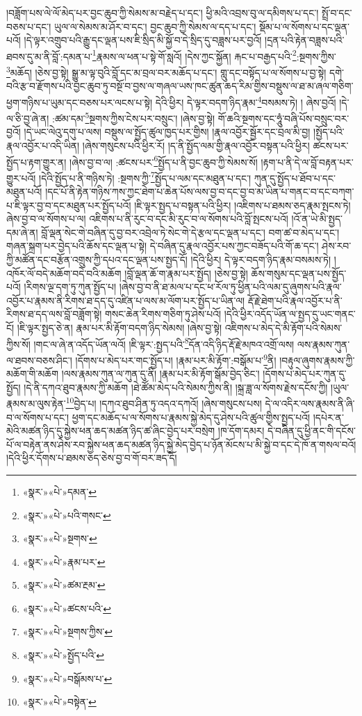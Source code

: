 །བཟློག་པས་ལེ་ལོ་མེད་པར་བྱང་ཆུབ་ཀྱི་སེམས་མ་བརྗེད་པ་དང་། ཕྱི་མའི་འབྲས་བུ་ལ་དམིགས་པ་དང་། སྤྲོ་བ་དང་བཅས་པ་དང་། ཡུལ་ལ་སེམས་མ་ཤོར་བ་དང་། བྱང་ཆུབ་ཀྱི་སེམས་ལ་དད་པ་དང་། སྡོམ་པ་ལ་སོགས་པ་དང་ལྡན་པའོ། །དེ་ལྟར་འགྲུབ་པའི་རྒྱུ་དང་ལྡན་པས་ཇི་སྲིད་མི་སྐྱོ་བ་དེ་སྲིད་དུ་བཟླས་པར་བྱའོ། །དྲན་པའི་རྟེན་བཟླས་པའི་ཐབས་དུ་མ་ནི་བློ་:དམན་པ་\footnote{«སྣར་»«པེ་»དམན་}རྣམས་ལ་ཕན་པ་སྟེ་གོ་སླའོ། །དེས་ཀྱང་སྐྱོན། རྐང་པ་བརྒྱད་པའི་\footnote{«སྣར་»«པེ་»པའི་གསང་}:སྔགས་ཀྱིས་\footnote{«སྣར་»«པེ་»སྔགས་}མཆོད། །ཅེས་བྱ་སྟེ། སྒྱུ་མ་ལྟ་བུའི་བློ་དང་མ་བྲལ་བར་མཆོད་པ་དང་། གླུ་དང་བསྟོད་པ་ལ་སོགས་པ་བྱ་སྟེ། དགེ་བའི་རྩ་བ་རྫོགས་པའི་བྱང་ཆུབ་ཏུ་བསྔོ་བ་བྱས་ལ་གཞལ་ཡས་ཁང་ཚུན་ཆད་རིམ་གྱིས་བསྡུས་ལ་ཐ་མ་ཞལ་གཅིག་ཕྱག་གཉིས་པ་ཡུམ་དང་བཅས་པར་ལངས་པ་སྟེ། དེའི་ཕྱིར། དེ་ལྟར་བདག་ཉིད་རྣམ་\footnote{«སྣར་»«པེ་»རྣམ་པར་}བསམས་ཏེ། །
ཞེས་བྱའོ། །དེ་ལ་ཅི་བྱ་ཞེ་ན། :ཚམ་དམ་\footnote{«སྣར་»«པེ་»ཚམ་རྔམ་}སྔགས་ཀྱིས་ངེས་པར་བསྲུང་། །ཞེས་བྱ་སྟེ། གོ་ཆའི་སྔགས་དང་ཧཱུཾ་བཞི་པོས་བསྲུང་བར་བྱའོ། །དེ་ཡང་ལེའུ་དགུ་པ་ལས། བསྡུས་ལ་སྤྱོད་ཚུལ་ཁྱད་པར་གྱིས། །རྣལ་འབྱོར་སྦྱོར་དང་བྲལ་མི་བྱ། །སྤྱོད་པའི་རྣལ་འབྱོར་པ་འདི་ཡིན། །ཞེས་གསུངས་པའི་ཕྱིར་རོ། །ད་ནི་སྤྱོད་ལམ་གྱི་རྣལ་འབྱོར་བསྟན་པའི་ཕྱིར། ཚངས་པར་སྤྱོད་པ་རྟག་གྱུར་ན། །ཞེས་བྱ་བ་ལ། :ཚངས་པར་\footnote{«སྣར་»«པེ་»ཚངས་པའི་}སྤྱོད་པ་ནི་བྱང་ཆུབ་ཀྱི་སེམས་སོ། །རྟག་པ་ནི་དེ་ལ་བློ་བརྟན་པར་གྱུར་པའོ། །དེའི་སྤྱོད་པ་ནི་གཉིས་ཏེ། :སྔགས་ཀྱི་\footnote{«སྣར་»«པེ་»སྔགས་ཀྱིས་}སྤྱོད་པ་ལམ་དང་མཐུན་པ་དང་། ཀུན་དུ་སྤྱོད་པ་ཐོབ་པ་དང་མཐུན་པའོ། །དང་པོ་ནི་རྟེན་གཉིས་ཀས་ཀྱང་ཐེག་པ་ཆེན་པོས་ལས་བྱ་བ་དང་བྱ་བ་མ་ཡིན་པ་གནང་བ་དང་བཀག་པ་ཇི་ལྟར་བྱ་བ་དང་མཐུན་པར་སྤྱོད་པའོ། །ཇི་ལྟར་སྤྱད་པ་བསྟན་པའི་ཕྱིར། །འཇིགས་པ་ཐམས་ཅད་རྣམ་སྤངས་ཏེ། ཞེས་བྱ་བ་ལ་སོགས་པ་ལ། འཇིགས་པ་ནི་རུང་བ་དང་མི་རུང་བ་ལ་སོགས་པའི་བློ་སྤངས་པའོ། །འོ་ན་ཡེ་མི་སྤྱད་དམ་ཞེ་ན། བློ་ལྡན་སེང་གེ་བཞིན་དུ་བྱ་བར་འབྲེལ་ཏེ་སེང་གེ་དེ་རྩལ་དང་ལྡན་པ་དང་། བག་ཚ་བ་མེད་པ་དང་། གཞན་སྐྲག་པར་བྱེད་པའི་ཆོས་དང་ལྡན་པ་སྟེ། དེ་བཞིན་དུ་རྣལ་འབྱོར་པས་ཀྱང་བཟོད་པའི་གོ་ཆ་དང་། ཤེས་རབ་ཀྱི་མཚོན་དང་བརྩོན་འགྲུས་ཀྱི་དཔའ་དང་ལྡན་པས་སྤྱད་དོ། །དེའི་ཕྱིར། དེ་ལྟར་བདག་ཉིད་རྣམ་བསམས་ཏེ། །འཁོར་ལོ་བདེ་མཆོག་བདེ་བའི་མཆོག །བློ་ལྡན་ཆོ་ག་རྣམ་པར་སྤྱོད། །ཅེས་བྱ་སྟེ། ཆོས་གསུམ་དང་ལྡན་པས་སྤྱོད་པའོ། །རིགས་ལྔ་དག་ཏུ་ཀུན་སྤྱོད་པ། །ཞེས་བྱ་བ་ནི་ཐ་མལ་པ་དང་ཕ་རོལ་ཏུ་ཕྱིན་པའི་ལམ་དུ་ཞུགས་པའི་རྣལ་འབྱོར་པ་རྣམས་ནི་རིགས་ཐ་དད་དུ་འཛིན་པ་ལས་མ་ལོག་པར་སྤྱོད་པ་ཡིན་ལ། རྡོ་རྗེ་ཐེག་པའི་རྣལ་འབྱོར་པ་ནི་རིགས་ཐ་དད་ལས་བློ་བཟློག་སྟེ། གསང་ཆེན་རིགས་གཅིག་ཏུ་ཤེས་པའོ། །དེའི་ཕྱིར་འདོད་ཡོན་ལ་སྤྱད་དུ་ཡང་གནང་ངོ། །ཇི་ལྟར་སྤྱད་ཅེ་ན། རྣམ་པར་མི་རྟོག་བདག་ཉིད་སེམས། །ཞེས་བྱ་སྟེ། འཇིགས་པ་མེད་དེ་མི་རྟོག་པའི་སེམས་ཀྱིས་སོ། །གང་ལ་ཞེ་ན་འདོད་ཡོན་ལའོ། །ཇི་ལྟར་:སྤྱད་པའི་\footnote{«སྣར་»«པེ་»སྤྱོད་པའི་}དོན་འདི་ཉིད་རྡོ་རྗེ་མཁའ་འགྲོ་ལས། ལས་རྣམས་ཀུན་ལ་ཐབས་བཅས་ཤིང་། །དོགས་པ་མེད་པར་གང་སྤྱོད་པ། །རྣམ་པར་མི་རྟོག་:བསྒོམ་པ་\footnote{«སྣར་»«པེ་»བསྒོམས་པ་}ནི། །བརྟུལ་ཞུགས་རྣམས་ཀྱི་མཆོག་གི་མཆོག །ལས་རྣམས་ཀུན་ལ་ཀུན་དུ་ནི། །རྣམ་པར་མི་རྟོག་སྒོམ་བྱེད་ཅིང་། །དོགས་པ་མེད་པར་ཀུན་དུ་སྤྱོད། །དེ་ནི་དཀའ་ཐུབ་རྣམས་ཀྱི་མཆོག །ཐེ་ཚོམ་མེད་པའི་སེམས་ཀྱིས་ནི། །སྐྲ་ཟླ་ལ་སོགས་རྗེས་དངོས་ཀྱི། །ཡུལ་རྣམས་མ་ལུས་རྟེན་\footnote{«སྣར་»«པེ་»བསྟེན་}བྱེད་པ། །དཀའ་ཐུབ་ཤིན་ཏུ་འདའ་དཀའོ། །ཞེས་གསུངས་པས། དེ་ལ་འདིར་ལས་རྣམས་ནི་ཞི་བ་ལ་སོགས་པ་དང་། ཕྱག་དང་མཆོད་པ་ལ་སོགས་པ་རྣམས་སྐྱེ་མེད་དུ་ཤེས་པའི་ཚུལ་གྱིས་སྤྱད་པའོ། །དཔེར་ན་མེའི་མཚན་ཉིད་དུ་སྐྱེས་ཕན་ཆད་མཚན་ཉིད་ཚ་ཞིང་བྱེད་པར་བསྲེག །ཁ་དོག་དམར། དེ་བཞིན་དུ་ཕྱི་ནང་གི་དངོས་པོ་ལ་བརྟེན་ནས་ཤེས་རབ་སྐྱེས་ཕན་ཆད་མཚན་ཉིད་སྐྱེ་མེད་བྱེད་པ་ཉོན་མོངས་པ་མི་སྐྱེ་བ་དང་དེ་ཁོ་ན་གསལ་བའོ། །དེའི་ཕྱིར་དོགས་པ་ཐམས་ཅད་ཅེས་བྱ་བ་གོ་བར་ཟད་དོ། 